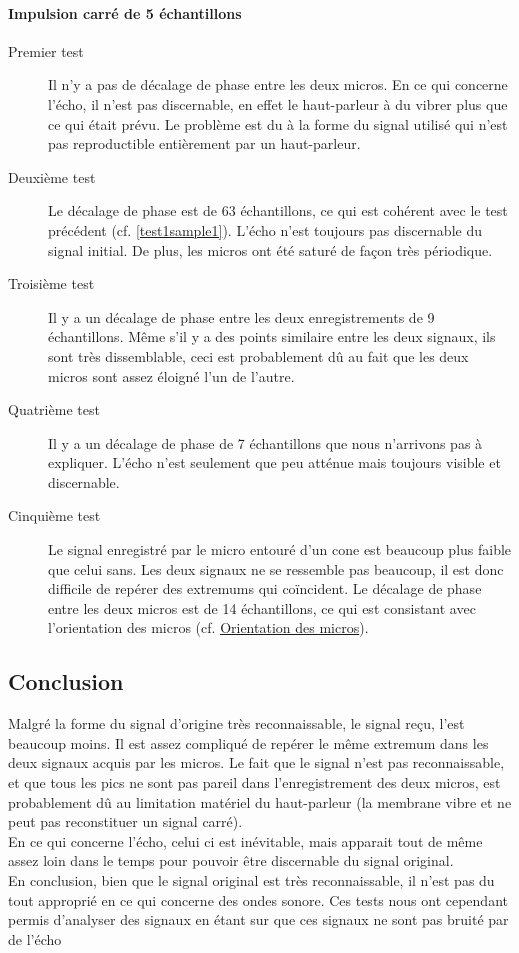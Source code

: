\paragraph{Impulsion carré de 5 échantillons}
\begin{description}
\item[Premier test] Il n'y a pas de décalage de phase entre les deux micros. En ce qui concerne l'écho, il n'est pas discernable, en effet le haut-parleur à du vibrer plus que ce qui était prévu. Le problème est du à la forme du signal utilisé qui n'est pas reproductible entièrement par un haut-parleur.
\item[Deuxième test] Le décalage de phase est de 63 échantillons, ce qui est cohérent avec le test précédent (cf. \ref{test1sample1}). L'écho n'est toujours pas discernable du signal initial. De plus, les micros ont été saturé de façon très périodique.
\item[Troisième test]Il y a un décalage de phase entre les deux enregistrements de 9 échantillons. Même s'il y a des points similaire entre les deux signaux, ils sont très dissemblable, ceci est probablement dû au fait que les deux micros sont assez éloigné l'un de l'autre.
\item[Quatrième test] Il y a un décalage de phase de 7 échantillons que nous n'arrivons pas à expliquer. L'écho n'est seulement que peu atténue mais toujours visible et discernable.
\item[Cinquième test] Le signal enregistré par le micro entouré d'un cone est beaucoup plus faible que celui sans. Les deux signaux ne se ressemble pas beaucoup, il est donc difficile de repérer des extremums qui coïncident.  Le décalage de phase entre les deux micros est de 14 échantillons, ce qui est consistant avec l'orientation des micros (cf. \hyperref[orientation_micro]{Orientation des micros}).
 \end{description}

\subsection{Conclusion}

Malgré la forme du signal d'origine très reconnaissable, le signal reçu, l'est beaucoup moins. Il est assez compliqué de repérer le même extremum dans les deux signaux acquis par les micros. Le fait que le signal n'est pas reconnaissable, et que tous les pics ne sont pas pareil dans l'enregistrement des deux micros, est probablement dû au limitation matériel du haut-parleur (la membrane vibre et ne peut pas reconstituer un signal carré). \\
En ce qui concerne l'écho, celui ci est inévitable, mais apparait tout de même assez loin dans le temps pour pouvoir être discernable du signal original. \\
En conclusion, bien que le signal original est très reconnaissable, il n'est pas du tout approprié en ce qui concerne des ondes sonore. Ces tests nous ont cependant permis d'analyser des signaux en étant sur que ces signaux ne sont pas bruité par de l'écho
	
